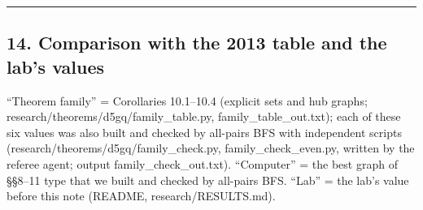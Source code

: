 \documentclass[
  11pt,
]{article}
\begin{document}
\begin{center}\rule{0.5\linewidth}{0.5pt}\end{center}

\hypertarget{comparison-with-the-2013-table-and-the-labs-values}{%
\subsection{14. Comparison with the 2013 table and the lab's
values}\label{comparison-with-the-2013-table-and-the-labs-values}}

``Theorem family'' = Corollaries 10.1--10.4 (explicit sets and hub
graphs; research/theorems/d5gq/family\_table.py,
family\_table\_out.txt); each of these six values was also built and
checked by all-pairs BFS with independent scripts
(research/theorems/d5gq/family\_check.py, family\_check\_even.py,
written by the referee agent; output family\_check\_out.txt).
``Computer'' = the best graph of §§8--11 type that we built and checked
by all-pairs BFS. ``Lab'' = the lab's value before this note (README,
research/RESULTS.md).
\end{document}
